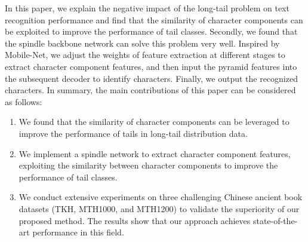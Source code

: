 In this paper, we explain the negative impact of the long-tail problem on text recognition performance and find that the similarity of character components can be exploited to improve the performance of tail classes. Secondly, we found that the spindle backbone network can solve this problem very well. Inspired by Mobile-Net, we adjust the weights of feature extraction at different stages to extract character component features, and then input the pyramid features into the subsequent decoder to identify characters. Finally, we output the recognized characters.
In summary, the main contributions of this paper can be considered as follows:
\begin{enumerate}[noitemsep]
    \item We found that the similarity of character components can be leveraged to improve the performance of tails in long-tail distribution data.
    \item We implement a spindle network to extract character component features, exploiting the similarity between character components to improve the performance of tail classes.
    \item We conduct extensive experiments on three challenging Chinese ancient book datasets (TKH, MTH1000, and MTH1200) to validate the superiority of our proposed method. The results show that our approach achieves state-of-the-art performance in this field.
\end{enumerate}
